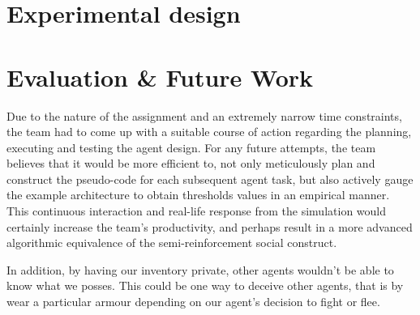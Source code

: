 


\section{Experimental design}



\section{Evaluation \& Future Work}

Due to the nature of the assignment and an extremely narrow time constraints, the team had to come up with a suitable course of action regarding the planning, executing and testing the agent design. For any future attempts, the team believes that it would be more efficient to, not only meticulously plan and construct the pseudo-code for each subsequent agent task, but also actively gauge the example architecture to obtain thresholds values in an empirical manner. This continuous interaction and real-life response from the simulation would certainly increase the team's productivity, and perhaps result in a more advanced algorithmic equivalence of the semi-reinforcement social construct.

In addition, by having our inventory private, other agents wouldn't be able to know what we posses. This could be one way to deceive other agents, that is by wear a particular armour depending on our agent's decision to fight or flee. 